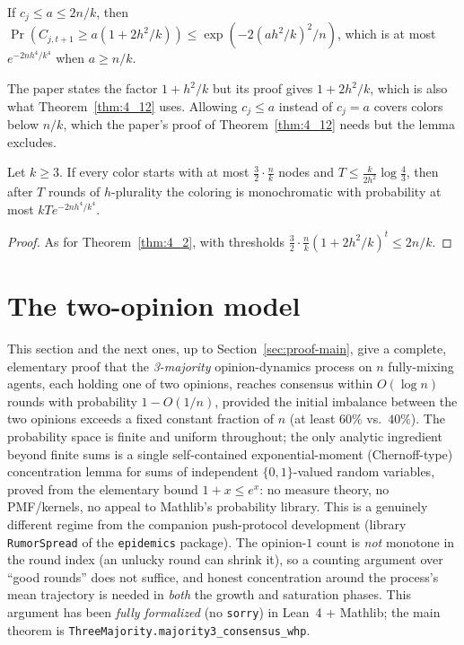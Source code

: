 \begin{lemma}[Lemma 4.11]\label{lem:4_11}
  \leanok
  If $c_j \le a \le 2n/k$, then
  $\Pr(C_{j,t+1} \ge a(1 + 2h^2/k)) \le \exp(-2(ah^2/k)^2/n)$, which is at
  most $e^{-2nh^4/k^4}$ when $a \ge n/k$.
\end{lemma}

\begin{remark}
  The paper states the factor $1 + h^2/k$ but its proof gives
  $1 + 2h^2/k$, which is also what Theorem~\ref{thm:4_12} uses. Allowing
  $c_j \le a$ instead of $c_j = a$ covers colors below $n/k$, which the
  paper's proof of Theorem~\ref{thm:4_12} needs but the lemma excludes.
\end{remark}

\begin{theorem}\label{thm:4_12}
  \leanok
  Let $k \ge 3$. If every color starts with at most $\frac32\cdot\frac nk$
  nodes and $T \le \frac{k}{2h^2}\log\frac43$, then after $T$ rounds of
  $h$-plurality the coloring is monochromatic with probability at most
  $kT e^{-2nh^4/k^4}$.
\end{theorem}

\begin{proof}
  \leanok
  As for Theorem~\ref{thm:4_2}, with thresholds
  $\frac32\cdot\frac nk(1 + 2h^2/k)^t \le 2n/k$.
\end{proof}

\section{The two-opinion model}\label{sec:binary-model}

This section and the next ones, up to Section~\ref{sec:proof-main}, give a complete, elementary
proof that the \emph{3-majority} opinion-dynamics process on $n$ fully-mixing agents, each
holding one of two opinions, reaches consensus within $O(\log n)$ rounds with probability
$1-O(1/n)$, provided the initial imbalance between the two opinions exceeds a fixed constant
fraction of $n$ (at least $60\%$ vs.\ $40\%$). The probability space is finite and uniform
throughout; the only analytic ingredient beyond finite sums is a single self-contained
exponential-moment (Chernoff-type) concentration lemma for sums of independent
$\{0,1\}$-valued random variables, proved from the elementary bound $1+x \le e^x$: no measure
theory, no PMF/kernels, no appeal to Mathlib's probability library. This is a genuinely
different regime from the companion push-protocol development (library \texttt{RumorSpread} of
the \texttt{epidemics} package). The opinion-$1$ count is \emph{not} monotone in the round index
(an unlucky round can shrink it), so a counting argument over ``good rounds'' does not suffice,
and honest concentration around the process's mean trajectory is needed in \emph{both} the
growth and saturation phases. This argument has been \emph{fully formalized} (no
\texttt{sorry}) in Lean~4 + Mathlib; the main theorem is
\texttt{ThreeMajority.majority3\_consensus\_whp}.

